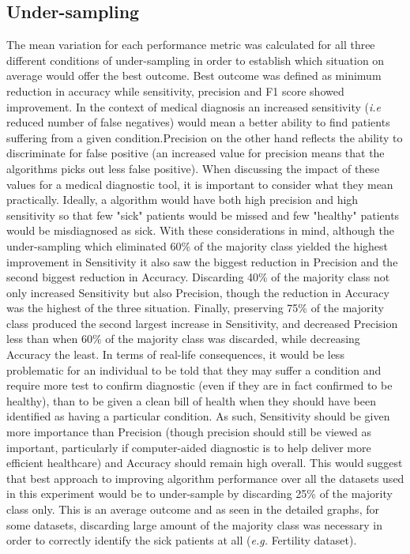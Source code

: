 \subsection{Under-sampling}
The mean variation for each performance metric was calculated for all three different conditions of under-sampling in order to establish which situation on average would offer the best outcome. Best outcome was defined as minimum reduction in accuracy while sensitivity, precision and F1 score showed improvement.\newline
In the context of medical diagnosis an increased sensitivity (\textit{i.e} reduced number of false negatives) would mean a better ability to find patients suffering from a given condition.\newline Precision on the other hand reflects the ability to discriminate for false positive (an increased value for precision means that the algorithms picks out less false positive). When discussing the impact of these values for a medical diagnostic tool, it is important to consider what they mean practically. Ideally, a algorithm would have both high precision and high sensitivity so that few "sick" patients would be missed and few "healthy" patients would be misdiagnosed as sick.\newline
With these considerations in mind, although the under-sampling which eliminated 60\% of the majority class yielded the highest improvement in Sensitivity it also saw the biggest reduction in Precision and the second biggest reduction in Accuracy. Discarding 40\% of the majority class not only increased Sensitivity but also Precision, though the reduction in Accuracy was the highest of the three situation.\newline
Finally, preserving 75\% of the majority class produced the second largest increase in Sensitivity, and decreased Precision less than when 60\% of the majority class was discarded, while decreasing Accuracy the least.\newline
In terms of real-life consequences, it would be less problematic for an individual to be told that they may suffer a condition and require more test to confirm diagnostic (even if they are in fact confirmed to be healthy), than to be given a clean bill of health when they should have been identified as having a particular condition. As such, Sensitivity should be given more importance than Precision (though precision should still be viewed as important, particularly if computer-aided diagnostic is to help deliver more efficient healthcare) and Accuracy should remain high overall. This would suggest that best approach to improving algorithm performance over all the datasets used in this experiment would be to under-sample by discarding 25\% of the majority class only. This is an average outcome and as seen in the detailed graphs, for some datasets, discarding large amount of the majority class was necessary in order to correctly identify the sick patients at all (\textit{e.g.} Fertility dataset). \newline


